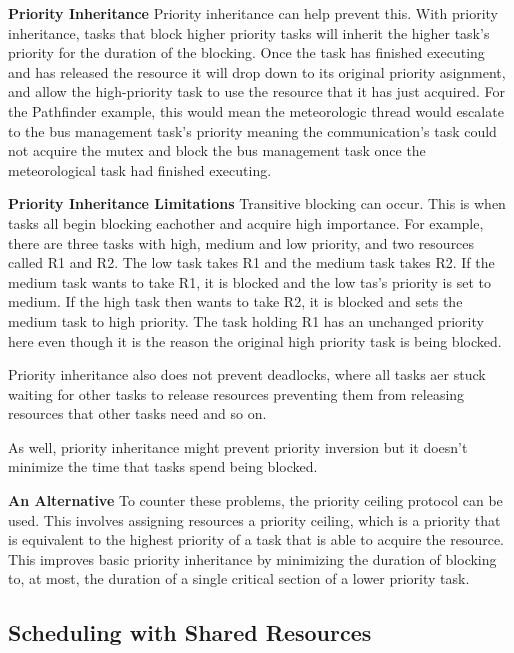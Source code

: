 \documentclass[]{report}
\begin{document}
			\textbf{Priority Inheritance}\newline
			Priority inheritance can help prevent this. With priority inheritance, tasks that block higher priority tasks will inherit the higher task's priority for the duration of the blocking. Once the task has finished executing and has released the resource it will drop down to its original priority asignment, and allow the high-priority task to use the resource that it has just acquired. For the Pathfinder example, this would mean the meteorologic thread would escalate to the bus management task's priority meaning the communication's task could not acquire the mutex and block the bus management task once the meteorological task had finished executing. 
			\medskip
			
			\textbf{Priority Inheritance Limitations}\newline
			Transitive blocking can occur. This is when tasks all begin blocking eachother and acquire high importance. For example, there are three tasks with high, medium and low priority, and two resources called R1 and R2. The low task takes R1 and the medium task takes R2. If the medium task wants to take R1, it is blocked and the low tas's priority is set to medium. If the high task then wants to take R2, it is blocked and sets the medium task to high priority. The task holding R1 has an unchanged priority here even though it is the reason the original high priority task is being blocked.
			
			Priority inheritance also does not prevent deadlocks, where all tasks aer stuck waiting for other tasks to release resources preventing them from releasing resources that other tasks need and so on.
			
			As well, priority inheritance might prevent priority inversion but it doesn't minimize the time that tasks spend being blocked.
			\medskip
			
			\textbf{An Alternative}
			To counter these problems, the priority ceiling protocol can be used. This involves assigning resources a priority ceiling, which is a priority that is equivalent to the highest priority of a task that is able to acquire the resource. This improves basic priority inheritance by minimizing the duration of blocking to, at most, the duration of a single critical section of a lower priority task\cite{goodenough1988priority}.
		
		\subsection{Scheduling with Shared Resources}
\end{document}
